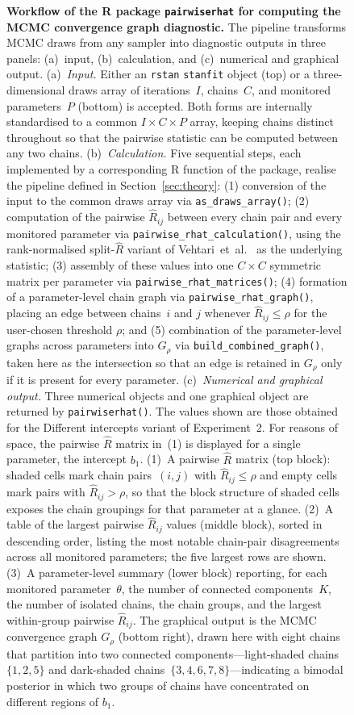 \begin{figure}[t]
{\begin{tikzpicture}
\end{tikzpicture}%
}%
%
\caption{%
\textbf{Workflow of the R package \texttt{pairwiserhat} for computing the
MCMC convergence graph diagnostic.}
The pipeline transforms MCMC draws from any sampler into diagnostic outputs
in three panels: (a)~input, (b)~calculation, and (c)~numerical and graphical
output.
%
(a)~\emph{Input.} Either an \texttt{rstan} \texttt{stanfit} object (top) or
a three-dimensional draws array of iterations~$I$, chains~$C$, and monitored
parameters~$P$ (bottom) is accepted. Both forms are internally standardised
to a common $I\times C\times P$ array, keeping chains distinct throughout so
that the pairwise statistic can be computed between any two chains.
%
(b)~\emph{Calculation.} Five sequential steps, each implemented by a
corresponding R function of the package, realise the pipeline defined in
Section~\ref{sec:theory}: (1) conversion of the input to the common draws
array via \texttt{as\_draws\_array()}; (2) computation of the pairwise
$\hat{R}_{ij}$ between every chain pair and every monitored parameter via
\texttt{pairwise\_rhat\_calculation()}, using the rank-normalised
split-$\hat{R}$ variant of Vehtari~et~al.~\cite{vehtari2021} as the
underlying statistic; (3) assembly of these values into one $C\times C$
symmetric matrix per parameter via \texttt{pairwise\_rhat\_matrices()};
(4) formation of a parameter-level chain graph via
\texttt{pairwise\_rhat\_graph()}, placing an edge between chains~$i$ and
$j$ whenever $\hat{R}_{ij}\le\rho$ for the user-chosen threshold $\rho$;
and (5) combination of the parameter-level graphs across parameters into
$G_{\rho}$ via \texttt{build\_combined\_graph()}, taken here as the
intersection so that an edge is retained in $G_{\rho}$ only if it is
present for every parameter.
%
(c)~\emph{Numerical and graphical output.} Three numerical objects and one
graphical object are returned by \texttt{pairwiserhat()}. The values shown
are those obtained for the Different intercepts variant of Experiment~2.
For reasons of space, the pairwise $\hat{R}$ matrix in~(1) is displayed
for a single parameter, the intercept $b_1$. (1)~A pairwise $\hat{R}$
matrix (top block): shaded cells mark chain pairs~$(i,j)$ with
$\hat{R}_{ij}\le\rho$ and empty cells mark pairs with
$\hat{R}_{ij}>\rho$, so that the block structure of shaded cells exposes
the chain groupings for that parameter at a glance. (2)~A table of the
largest pairwise $\hat{R}_{ij}$ values (middle block), sorted in
descending order, listing the most notable chain-pair disagreements
across all monitored parameters; the five largest rows are shown. (3)~A
parameter-level summary (lower block) reporting, for each monitored
parameter~$\theta$, the number of connected components~$K$, the number of
isolated chains, the chain groups, and the largest within-group pairwise
$\hat{R}_{ij}$. The graphical output is the MCMC convergence graph
$G_{\rho}$ (bottom right), drawn here with eight chains that partition
into two connected components---light-shaded chains~$\{1,2,5\}$ and
dark-shaded chains~$\{3,4,6,7,8\}$---indicating a bimodal posterior in
which two groups of chains have concentrated on different regions of
$b_1$.
}
\label{fig:package-workflow}
\end{figure}
